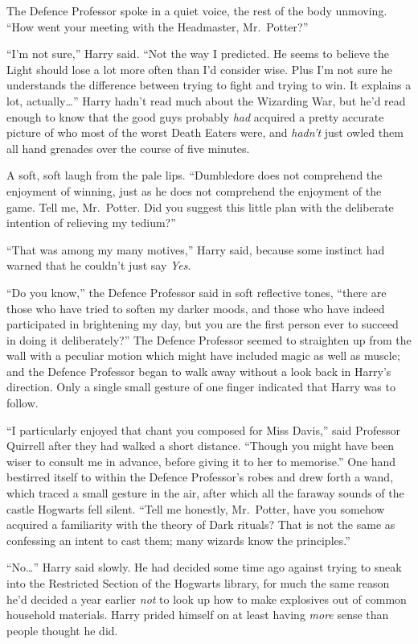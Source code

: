 The Defence Professor spoke in a quiet voice, the rest of the body
unmoving. ``How went your meeting with the Headmaster, Mr.~Potter?''

``I'm not sure,'' Harry said. ``Not the way I predicted. He seems to
believe the Light should lose a lot more often than I'd consider wise.
Plus I'm not sure he understands the difference between trying to fight
and trying to win. It explains a lot, actually\ldots{}'' Harry hadn't
read much about the Wizarding War, but he'd read enough to know that the
good guys probably \emph{had} acquired a pretty accurate picture of who
most of the worst Death Eaters were, and \emph{hadn't} just owled them
all hand grenades over the course of five minutes.

A soft, soft laugh from the pale lips. ``Dumbledore does not comprehend
the enjoyment of winning, just as he does not comprehend the enjoyment
of the game. Tell me, Mr.~Potter. Did you suggest this little plan with
the deliberate intention of relieving my tedium?''

``That was among my many motives,'' Harry said, because some instinct
had warned that he couldn't just say \emph{Yes}.

``Do you know,'' the Defence Professor said in soft reflective tones,
``there are those who have tried to soften my darker moods, and those
who have indeed participated in brightening my day, but you are the
first person ever to succeed in doing it deliberately?'' The Defence
Professor seemed to straighten up from the wall with a peculiar motion
which might have included magic as well as muscle; and the Defence
Professor began to walk away without a look back in Harry's direction.
Only a single small gesture of one finger indicated that Harry was to
follow.

``I particularly enjoyed that chant you composed for Miss Davis,'' said
Professor Quirrell after they had walked a short distance. ``Though you
might have been wiser to consult me in advance, before giving it to her
to memorise.'' One hand bestirred itself to within the Defence
Professor's robes and drew forth a wand, which traced a small gesture in
the air, after which all the faraway sounds of the castle Hogwarts fell
silent. ``Tell me honestly, Mr.~Potter, have you somehow acquired a
familiarity with the theory of Dark rituals? That is not the same as
confessing an intent to cast them; many wizards know the principles.''

``No\ldots{}'' Harry said slowly. He had decided some time ago against
trying to sneak into the Restricted Section of the Hogwarts library, for
much the same reason he'd decided a year earlier \emph{not} to look up
how to make explosives out of common household materials. Harry prided
himself on at least having \emph{more} sense than people thought he did.

